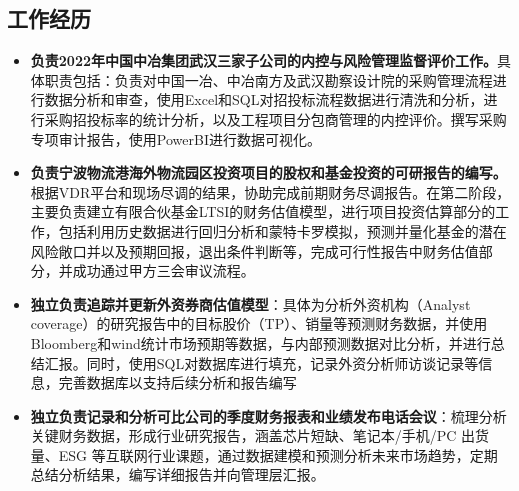 \documentclass{resume}
\begin{document}
\vspace{-18pt}
\begin{1.5}
\section{工作经历}



\begin{itemize}[itemsep=0.8ex, parsep=0.6ex]%
\setstretch{1.2em}
  \item \textbf{负责2022年中国中冶集团武汉三家子公司的内控与风险管理监督评价工作。}具体职责包括：负责对中国一冶、中冶南方及武汉勘察设计院的采购管理流程进行数据分析和审查，使用Excel和SQL对招投标流程数据进行清洗和分析，进行采购招投标率的统计分析，以及工程项目分包商管理的内控评价。撰写采购专项审计报告，使用PowerBI进行数据可视化。
  \item \textbf{负责宁波物流港海外物流园区投资项目的股权和基金投资的可研报告的编写。}根据VDR平台和现场尽调的结果，协助完成前期财务尽调报告。在第二阶段，主要负责建立有限合伙基金LTSI的财务估值模型，进行项目投资估算部分的工作，包括利用历史数据进行回归分析和蒙特卡罗模拟，预测并量化基金的潜在风险敞口并以及预期回报，退出条件判断等，完成可行性报告中财务估值部分，并成功通过甲方三会审议流程。
\end{itemize}

\begin{itemize}[itemsep=0.8ex, parsep=0.6ex]
  \item \textbf{独立负责追踪并更新外资券商估值模型}：具体为分析外资机构（Analyst coverage）的研究报告中的目标股价（TP）、销量等预测财务数据，并使用Bloomberg和wind统计市场预期等数据，与内部预测数据对比分析，并进行总结汇报。同时，使用SQL对数据库进行填充，记录外资分析师访谈记录等信息，完善数据库以支持后续分析和报告编写
  \item \textbf{独立负责记录和分析可比公司的季度财务报表和业绩发布电话会议}：梳理分析关键财务数据，形成行业研究报告，涵盖芯片短缺、笔记本/手机/PC 出货量、ESG 等互联网行业课题，通过数据建模和预测分析未来市场趋势，定期总结分析结果，编写详细报告并向管理层汇报。
\end{itemize}
\end{1.5}
\end{document}
